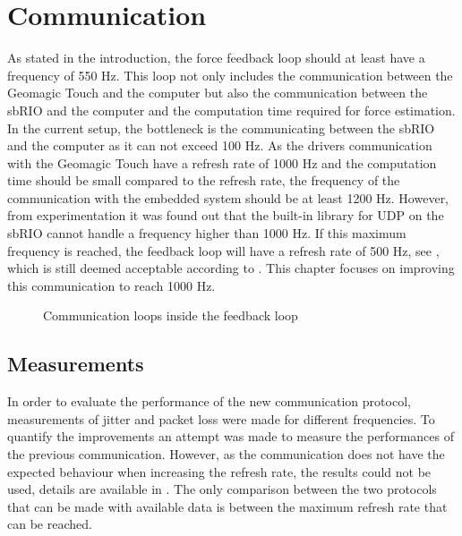 \chapter{Communication}\label{cha:communication}

As stated in the introduction, the force feedback loop should at least have a frequency of 550 Hz. This loop not only includes the communication between the Geomagic Touch and the computer but also the communication between the sbRIO and the computer and the computation time required for force estimation. In the current setup, the bottleneck is the communicating between the sbRIO and the computer as it can not exceed 100 Hz. As the drivers communication with the Geomagic Touch have a refresh rate of 1000 Hz and the computation time should be small compared to the refresh rate, the frequency of the communication with the embedded system should be at least 1200 Hz. However, from experimentation it was found out that the built-in library for UDP on the sbRIO cannot handle a frequency higher than 1000 Hz. If this maximum frequency is reached, the feedback loop will have a refresh rate of 500 Hz, see , which is still deemed acceptable according to \cite{coles2011role}.  This chapter focuses on improving this communication to reach 1000 Hz.

\begin{figure}[H]
	\centering
	
	\caption{Communication loops inside the feedback loop}
	\label{fig:speed_graph}
\end{figure}











\section{Measurements}

In order to evaluate the performance of the new communication protocol, measurements of jitter and packet loss were made for different frequencies. To quantify the improvements an attempt was made to measure the performances of the previous communication. However, as the communication does not have the expected behaviour when increasing the refresh rate, the results could not be used, details are available in . The only comparison between the two protocols that can be made with available data is between the maximum refresh rate that can be reached.

